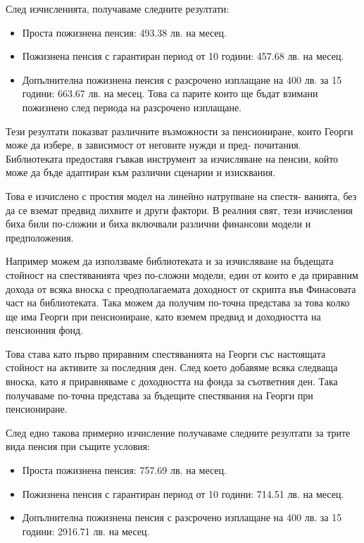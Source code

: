 \documentclass[a4paper,12pt]{article}
\begin{document}
След изчисленията, получаваме следните резултати:
\begin{itemize}
        \item Проста пожизнена пенсия: 493.38 лв. на месец.
        \item Пожизнена пенсия с гарантиран период от 10 години: 457.68 лв. на месец.
        \item Допълнителна пожизнена пенсия с разсрочено изплащане на 400 лв. за 15 години: 663.67 лв. на месец. Това са парите които ще бъдат взимани пожизнено след периода на разсрочено изплащане.
\end{itemize}

Тези резултати показват различните възможности за пенсиониране, които Георги може да избере, в зависимост от неговите нужди и пред- почитания. Библиотеката предоставя гъвкав инструмент за изчисляване на пенсии, който може да бъде адаптиран към различни сценарии и изисквания.

Това е изчислено с простия модел на линейно натрупване на спестя- ванията, без да се вземат предвид лихвите и други фактори. В реалния свят, тези изчисления биха били по-сложни и биха включвали различни финансови модели и предположения.

Например можем да използваме библиотеката и за изчисляване на бъдещата стойност на спестяванията чрез по-сложни модели, един от които е да приравним дохода от всяка вноска с преодполагаемата доходност от скрипта във Финасовата част на библиотеката. Така можем да получим по-точна представа за това колко ще има Георги при пенсиониране, като вземем предвид и доходността на пенсионния фонд.

Това става като първо приравним спестяванията на Георги със настоящата стойност на активите за последния ден. След което добавяме всяка следваща вноска, като я приравняваме с доходността на фонда за съответния ден. Така получаваме по-точна представа за бъдещите спестявания на Георги при пенсиониране.

След едно такова примерно изчисление получаваме следните резултати за трите вида пенсия при същите условия:
\begin{itemize}
        \item Проста пожизнена пенсия: 757.69 лв. на месец.
        \item Пожизнена пенсия с гарантиран период от 10 години: 714.51 лв. на месец.
        \item Допълнителна пожизнена пенсия с разсрочено изплащане на 400 лв. за 15 години: 2916.71 лв. на месец.
\end{itemize}
\end{document}
